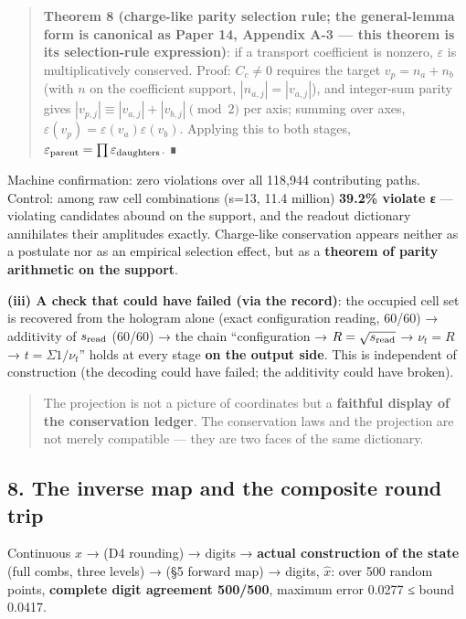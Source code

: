 \documentclass[
]{article}
\begin{document}
\begin{quote}
\textbf{Theorem 8 (charge-like parity selection rule; the general-lemma
form is canonical as Paper 14, Appendix A-3 --- this theorem is its
selection-rule expression)}: if a transport coefficient is nonzero,
\(\varepsilon\) is multiplicatively conserved. Proof: \(C_c\neq0\)
requires the target \(v_p=n_a+n_b\) (with \(n\) on the coefficient
support, \(|n_{a,j}|=|v_{a,j}|\)), and integer-sum parity gives
\(|v_{p,j}|\equiv|v_{a,j}|+|v_{b,j}|\pmod 2\) per axis; summing over
axes, \(\varepsilon(v_p)=\varepsilon(v_a)\varepsilon(v_b)\). Applying
this to both stages,
\(\varepsilon_{\rm parent}=\prod\varepsilon_{\rm daughters}\). ∎
\end{quote}

Machine confirmation: zero violations over all 118,944 contributing
paths. Control: among raw cell combinations (s=13, 11.4 million)
\textbf{39.2\% violate ε} --- violating candidates abound on the
support, and the readout dictionary annihilates their amplitudes
exactly. Charge-like conservation appears neither as a postulate nor as
an empirical selection effect, but as a \textbf{theorem of parity
arithmetic on the support}.

\textbf{(iii) A check that could have failed (via the record)}: the
occupied cell set is recovered from the hologram alone (exact
configuration reading, 60/60) → additivity of \(s_{\rm read}\) (60/60) →
the chain ``configuration → \(R=\sqrt{s_{\rm read}}\) → \(\nu_t=R\) →
\(t=\Sigma1/\nu_t\)'' holds at every stage \textbf{on the output side}.
This is independent of construction (the decoding could have failed; the
additivity could have broken).

\begin{quote}
The projection is not a picture of coordinates but a \textbf{faithful
display of the conservation ledger}. The conservation laws and the
projection are not merely compatible --- they are two faces of the same
dictionary.
\end{quote}

\subsection{8. The inverse map and the composite round
trip}\label{the-inverse-map-and-the-composite-round-trip}

Continuous \(x\) → (D4 rounding) → digits → \textbf{actual construction
of the state} (full combs, three levels) → (§5 forward map) → digits,
\(\hat x\): over 500 random points, \textbf{complete digit agreement
500/500}, maximum error 0.0277 ≤ bound 0.0417.
\end{document}
